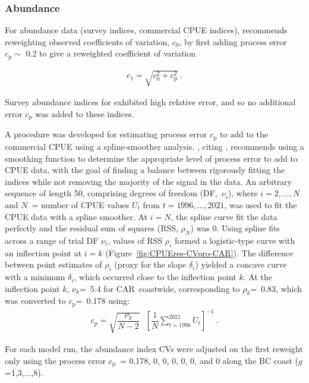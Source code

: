 \documentclass[11pt]{book}
\def\vsd{\vspace*{1ex}}     %
\renewcommand{\eb}{\vsd \vsd \begin{eqnarray}}
\renewcommand{\ee}{\end{eqnarray} \vsd }
\begin{document}
\subsubsection{Abundance} \label{sss:rwt_abund}


For abundance data (survey indices, commercial CPUE indices), \citet{Francis:2011} recommends reweighting observed coefficients of variation, $c_0$, by first adding process error $c_\text{p} \sim$ 0.2 to give a reweighted coefficient of variation

\eb
c_1 = \sqrt{c_0^2 + c_\text{p}^2}~. \label{reweight}
\ee

Survey abundance indices for \spc{} exhibited high relative error, and so no additional error $c_\text{p}$ was added to these indices.

A procedure was developed for estimating process error $c_\text{p}$ to add to the commercial CPUE using a spline-smoother analysis.
\citet{Francis:2011}, citing \citet{Clark-Hare:2006}, recommends using a smoothing function to determine the appropriate level of process error to add to CPUE data, with the goal of finding a balance between rigorously fitting the indices while not removing the majority of the signal in the data.
An arbitrary sequence of length 50, comprising degrees of freedom (DF,~$\nu_i$), where $i=2,...,N$ and $N$~= number of CPUE values $U_t$ from $t=1996,...,2021$, was used to fit the CPUE data with a spline smoother.
At $i=N$, the spline curve fit the data perfectly and the residual sum of squares (RSS, $\rho_N$) was 0.
Using spline fits across a range of trial DF $\nu_i$, values of RSS $\rho_i$ formed a logistic-type curve with an inflection point at $i=k$ (Figure~\ref{fig:CPUEres-CVpro-CAR}).
The difference between point estimates of $\rho_i$ (proxy for the slope $\delta_i$) yielded a concave curve with a minimum $\delta_i$, which occurred close to the inflection point $k$.
At the inflection point $k$, $\nu_k$=~5.4 for CAR~coastwide, corresponding to $\rho_k$=~0.83, which was converted to $c_\text{p}$=~0.178 using:
\vspace{-0.25\baselineskip}%
\eb
c_\text{p} = \sqrt{\dfrac{\rho_k}{N-2}}~~~{\left[ \dfrac{1}{N} \sum\limits_{t=1996}^{2021} U_t \right]}^{-1}~. \label{cvpro.cpue}
\ee

For each model run, the abundance index CVs were adjusted on the first reweight only using the process error $c_\text{p}$~= 0.178, 0, 0, 0, 0, 0, and 0 along the BC coast ($g$=1,3,...,8).

\graphicspath{{./english/}}  %
\end{document}
